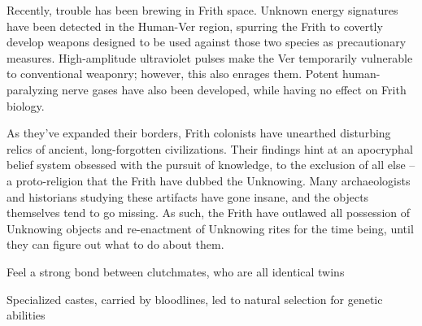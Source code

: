 \documentclass[blue]{guildcamp4}
\begin{document}
Recently, trouble has been brewing in Frith space. Unknown energy signatures have been detected in the Human-Ver region, spurring the Frith to covertly develop weapons designed to be used against those two species as precautionary measures. High-amplitude ultraviolet pulses make the Ver temporarily vulnerable to conventional weaponry; however, this also enrages them. Potent human-paralyzing nerve gases have also been developed, while having no effect on Frith biology.

As they've expanded their borders, Frith colonists have unearthed disturbing relics of ancient, long-forgotten civilizations. Their findings hint at an apocryphal belief system obsessed with the pursuit of knowledge, to the exclusion of all else -- a proto-religion that the Frith have dubbed the Unknowing. Many archaeologists and historians studying these artifacts have gone insane, and the objects themselves tend to go missing. As such, the Frith have outlawed all possession of Unknowing objects and re-enactment of Unknowing rites for the time being, until they can figure out what to do about them.
	
\begin{itemz}[To add]
\item Feel a strong bond between clutchmates, who are all identical twins
\item Specialized castes, carried by bloodlines, led to natural selection for genetic abilities 

\end{itemz}
	
\end{document}
